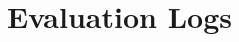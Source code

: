 \documentclass[fleqn,moreauthors,10pt]{ds_report}
\begin{document}
    




\clearpage
\appendix
\section*{Evaluation Logs}
\label{app:logs}


\end{document}
